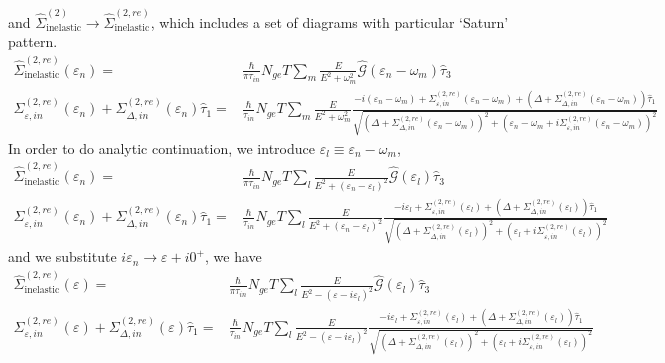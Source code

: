 \documentclass[]{article}
\begin{document}
and $\widehat{\Sigma}_\text{inelastic}^{(2)}\rightarrow \widehat{\Sigma}_\text{inelastic}^{(2,re)}$,
which includes a set of diagrams with particular `Saturn' pattern.
\begin{align}
    \widehat{\Sigma}_\text{inelastic}^{(2,re)}(\varepsilon_n)
    = & \frac{\hbar}{\pi\tau_{in}}N_{ge}T\sum_{m}\frac{E}{E^2+\omega_m^2}
    \widehat{\mathcal{G}}(\varepsilon_n-\omega_m)\widehat{\tau}_3 \\
    \Sigma_{\varepsilon,in}^{(2,re)}(\varepsilon_n) + \Sigma_{\Delta,in}^{(2,re)}(\varepsilon_n)\widehat{\tau}_1
    = & \frac{\hbar}{\tau_{in}}N_{ge}T\sum_{m}\frac{E}{E^2+\omega_m^2}
    \frac{-i(\varepsilon_n-\omega_m) + \Sigma_{\varepsilon,in}^{(2,re)}(\varepsilon_n-\omega_m)
     + \left(\Delta+\Sigma_{\Delta,in}^{(2,re)}(\varepsilon_n-\omega_m)\right)\widehat{\tau}_1}
     {\sqrt{\left(\Delta+\Sigma_{\Delta,in}^{(2,re)}(\varepsilon_n-\omega_m)\right)^2 
     + \left(\varepsilon_n-\omega_m+i\Sigma_{\varepsilon,in}^{(2,re)}(\varepsilon_n-\omega_m)\right)^2}}
\end{align}
In order to do analytic continuation, we introduce $\varepsilon_l \equiv \varepsilon_n - \omega_m$,
\begin{align}
    \widehat{\Sigma}_\text{inelastic}^{(2,re)}(\varepsilon_n)
    = & \frac{\hbar}{\pi\tau_{in}}N_{ge}T\sum_l\frac{E}{E^2+(\varepsilon_n-\varepsilon_l)^2}
    \widehat{\mathcal{G}}(\varepsilon_l)\widehat{\tau}_3 \\
    \Sigma_{\varepsilon,in}^{(2,re)}(\varepsilon_n) + \Sigma_{\Delta,in}^{(2,re)}(\varepsilon_n)\widehat{\tau}_1
    = & \frac{\hbar}{\tau_{in}}N_{ge}T\sum_l\frac{E}{E^2+(\varepsilon_n-\varepsilon_l)^2}
    \frac{-i\varepsilon_l + \Sigma_{\varepsilon,in}^{(2,re)}(\varepsilon_l)
     + \left(\Delta+\Sigma_{\Delta,in}^{(2,re)}(\varepsilon_l)\right)\widehat{\tau}_1}
     {\sqrt{\left(\Delta+\Sigma_{\Delta,in}^{(2,re)}(\varepsilon_l)\right)^2 
     + \left(\varepsilon_l+i\Sigma_{\varepsilon,in}^{(2,re)}(\varepsilon_l)\right)^2}}
\end{align}
and we substitute $i\varepsilon_n \rightarrow \varepsilon + i0^+$, we have
\begin{align}
    \widehat{\Sigma}_\text{inelastic}^{(2,re)}(\varepsilon)
    = & \frac{\hbar}{\pi\tau_{in}}N_{ge}T\sum_l\frac{E}{E^2-(\varepsilon-i\varepsilon_l)^2}
    \widehat{\mathcal{G}}(\varepsilon_l)\widehat{\tau}_3 \\
    \Sigma_{\varepsilon,in}^{(2,re)}(\varepsilon) + \Sigma_{\Delta,in}^{(2,re)}(\varepsilon)\widehat{\tau}_1
    = & \frac{\hbar}{\tau_{in}}N_{ge}T\sum_l\frac{E}{E^2-(\varepsilon-i\varepsilon_l)^2}
    \frac{-i\varepsilon_l + \Sigma_{\varepsilon,in}^{(2,re)}(\varepsilon_l)
     + \left(\Delta+\Sigma_{\Delta,in}^{(2,re)}(\varepsilon_l)\right)\widehat{\tau}_1}
     {\sqrt{\left(\Delta+\Sigma_{\Delta,in}^{(2,re)}(\varepsilon_l)\right)^2 
     + \left(\varepsilon_l+i\Sigma_{\varepsilon,in}^{(2,re)}(\varepsilon_l)\right)^2}}
\end{align}
\end{document}
